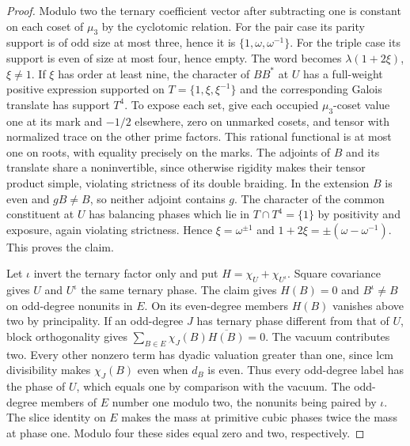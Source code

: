 \documentclass[11pt,a4paper]{article}
\numberwithin{equation}{section}
\theoremstyle{remark}
\begin{document}
\begin{proof}
Modulo two the ternary coefficient vector after subtracting one
is constant on each coset of $\mu_3$ by the cyclotomic relation.
For the pair case its parity support is of odd size at most three,
hence it is $\{1,\omega,\omega^{-1}\}$. For the triple case its
support is even of size at most four, hence empty. The word becomes
$\lambda(1+2\xi)$, $\xi\ne1$. If $\xi$ has order at least nine,
the character of $BB^*$ at $U$ has a full-weight positive
expression supported on
$T=\{1,\xi,\xi^{-1}\}$ and the corresponding Galois translate has support $T^4$. To expose each set, give each occupied $\mu_3$-coset
value one at its mark and $-1/2$ elsewhere,
zero on unmarked cosets, and tensor with normalized trace on the
other prime factors. This rational functional is at most one on
roots, with equality precisely on the marks. The adjoints of $B$
and its translate share a noninvertible, since otherwise rigidity makes
their tensor product simple, violating strictness of its double
braiding. In the extension $B$ is even and $gB\ne B$, so neither
adjoint contains $g$. The character of the common constituent at $U$ has balancing phases
which lie
in $T\cap T^4=\{1\}$ by positivity and exposure, again violating
strictness. Hence $\xi=\omega^{\pm1}$ and $1+2\xi=\pm(\omega-\omega^{-1})$. This proves the claim.

Let $\iota$ invert the ternary factor only and put
$H=\chi_U+\chi_{U^\iota}$. Square covariance gives $U$ and $U^\iota$ the same ternary phase.
The claim gives $H(B)=0$ and
$B^\iota\ne B$ on odd-degree nonunits in $E$. On its even-degree members $H(B)$
vanishes above two by principality.
If an odd-degree $J$ has ternary phase different from that of $U$,
block orthogonality gives $\sum_{B\in E}\chi_J(B)\overline{H(B)}=0$.
The vacuum contributes two. Every other nonzero term has dyadic
valuation greater than one, since lcm divisibility makes
$\chi_J(B)$ even when $d_B$ is even. Thus every odd-degree label has the phase of $U$, which equals one
by comparison with the vacuum.
The odd-degree members of $E$ number one modulo two, the nonunits
being paired by $\iota$. The slice identity on $E$ makes the mass
at primitive cubic phases twice the mass at phase one. Modulo four
these sides equal zero and two, respectively.
\end{proof}
\end{document}
